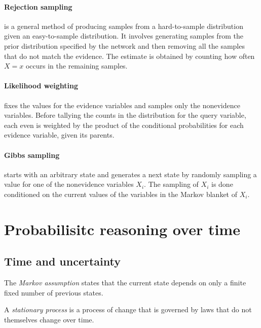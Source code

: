 \documentclass{article}
\begin{document}
\paragraph{Rejection sampling} is a general method of producing samples from a hard-to-sample
distribution given an easy-to-sample distribution. It involves generating samples from the
prior distribution specified by the network and then removing all the samples that do not
match the evidence. The estimate is obtained by counting how often $X=x$ occurs in the remaining
samples.

\paragraph{Likelihood weighting} fixes the values for the evidence variables and samples
only the nonevidence variables. Before tallying the counts in the distribution for the query
variable, each even is weighted by the product of the conditional probabilities for each evidence 
variable, given its parents.

\paragraph{Gibbs sampling} starts with an arbitrary state and generates a next state by randomly
sampling a value for one of the nonevidence variables $X_i$. The sampling of $X_i$ is done
conditioned on the current values of the variables in the Markov blanket of $X_i$.

\section{Probabilisitc reasoning over time}

\subsection{Time and uncertainty}

\begin{definition}
    The \emph{Markov assumption} states that the current
    state depends on only a finite fixed number of previous states.
\end{definition}

\begin{definition}
    A \emph{stationary process} is a process of change that is governed by laws
    that do not themselves change over time.
\end{definition}
\end{document}
